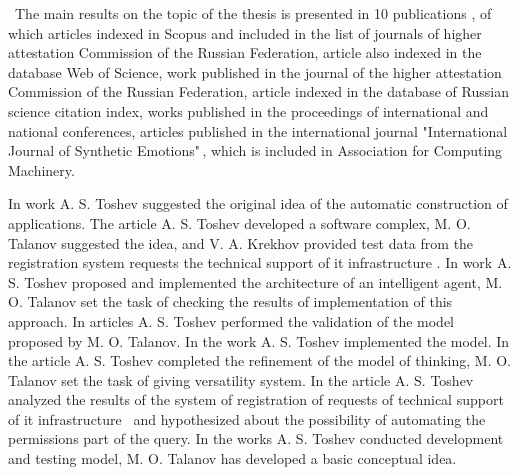 \publications\ The main results on the topic of the thesis is presented in 10 publications \cite{Lobachevskii, WCIT-2012,  ISGZ, IJSE-1, IJSE-2, RCDL-2014, AMSTA-2015, VAK-1, EB-1, EB-2}, of which articles \cite{RCDL-2014, AMSTA-2015} indexed in Scopus and included in the list of journals of higher attestation Commission of the Russian Federation, article \cite{AMSTA-2015} also indexed in the database Web of Science, work \cite{VAK-1} published in the journal of the higher attestation Commission of the Russian Federation, article \cite{ISGZ} indexed in the database of Russian science citation index, works \cite{Lobachevskii, WCIT-2012, ISGZ} published in the proceedings of international and national conferences, articles \cite{IJSE-1, IJSE-2} published in the international journal "International Journal of Synthetic Emotions"\,, which is included in Association for Computing Machinery. \par
In work \cite{Lobachevskii} A. S. Toshev suggested the original idea of the automatic construction of applications. The article \cite{WCIT-2012} A. S. Toshev developed a software complex, M. O. Talanov suggested the idea, and V. A. Krekhov provided test data from the registration system requests the technical support of it infrastructure \icl. In work \cite{ISGZ} A. S. Toshev proposed and implemented the architecture of an intelligent agent, M. O. Talanov set the task of checking the results of implementation of this approach. In articles \cite{IJSE-1, IJSE-2} A. S. Toshev performed the validation of the model proposed by M. O. Talanov. In the work \cite{RCDL-2014} A. S. Toshev implemented the model. In the article \cite{ AMSTA-2015} A. S. Toshev completed the refinement of the model of thinking, M. O. Talanov set the task of giving versatility system. In the article \cite{VAK-1} A. S. Toshev analyzed the results of the system of registration of requests of technical support of it infrastructure \icl\ and hypothesized about the possibility of automating the permissions part of the query. In the works \cite{EB-1, EB-2} A. S. Toshev conducted development and testing model, M. O. Talanov has developed a basic conceptual idea. \par


